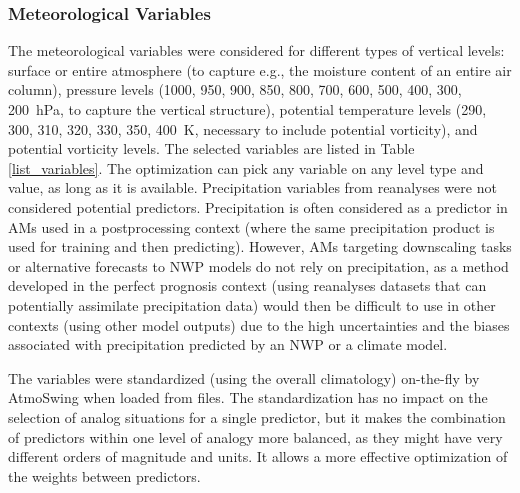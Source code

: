 \documentclass[draft]{agujournal2019}
\begin{document}
\subsubsection{Meteorological Variables}
\label{variables}

The meteorological variables were considered for different types of vertical levels: surface or entire atmosphere (to capture e.g., the moisture content of an entire air column), pressure levels (1000, 950, 900, 850, 800, 700, 600, 500, 400, 300, 200~hPa, to capture the vertical structure), potential temperature levels (290, 300, 310, 320, 330, 350, 400~K, necessary to include potential vorticity), and potential vorticity levels. The selected variables are listed in Table \ref{list_variables}. The optimization can pick any variable on any level type and value, as long as it is available. Precipitation variables from reanalyses were not considered potential predictors. Precipitation is often considered as a predictor in AMs used in a postprocessing context (where the same precipitation product is used for training and then predicting). However, AMs targeting downscaling tasks or alternative forecasts to NWP models do not rely on precipitation, as a method developed in the perfect prognosis context (using reanalyses datasets that can potentially assimilate precipitation data) would then be difficult to use in other contexts (using other model outputs) due to the high uncertainties and the biases associated with precipitation predicted by an NWP or a climate model.

The variables were standardized (using the overall climatology) on-the-fly by AtmoSwing when loaded from files. The standardization has no impact on the selection of analog situations for a single predictor, but it makes the combination of predictors within one level of analogy more balanced, as they might have very different orders of magnitude and units. It allows a more effective optimization of the weights between predictors.
\end{document}
